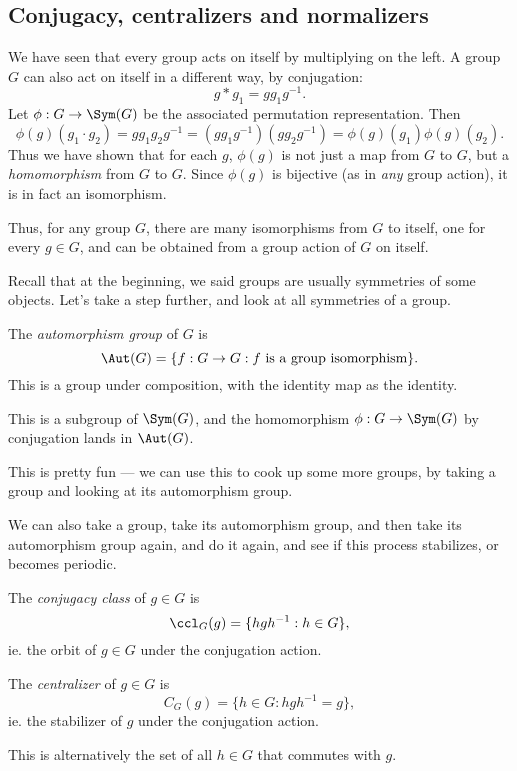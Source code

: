 \documentclass[a4paper]{article}
\begin{document}
\subsection{Conjugacy, centralizers and normalizers}
We have seen that every group acts on itself by multiplying on the left. A group $G$ can also act on itself in a different way, by conjugation:
\[
  g * g_1 = g g_1 g^{-1}.
\]
Let $\phi: G \to \Sym(G)$ be the associated permutation representation. Then
\[
  \phi(g) (g_1 \cdot g_2) = g g_1 g_2 g^{-1} = (g g_1 g^{-1})(g g_2 g^{-1}) = \phi(g)(g_1) \phi(g) (g_2).
\]
Thus we have shown that for each $g$, $\phi(g)$ is not just a map from $G$ to $G$, but a \emph{homomorphism} from $G$ to $G$. Since $\phi(g)$ is bijective (as in \emph{any} group action), it is in fact an isomorphism.

Thus, for any group $G$, there are many isomorphisms from $G$ to itself, one for every $g \in G$, and can be obtained from a group action of $G$ on itself.

Recall that at the beginning, we said groups are usually symmetries of some objects. Let's take a step further, and look at all symmetries of a group.
\begin{defi}
  The \emph{automorphism group} of $G$ is
  \[
    \Aut(G) = \{f: G \to G: f\text{ is a group isomorphism}\}.
  \]
  This is a group under composition, with the identity map as the identity.
\end{defi}
This is a subgroup of $\Sym(G)$, and the homomorphism $\phi: G\to \Sym(G)$ by conjugation lands in $\Aut(G)$.

This is pretty fun --- we can use this to cook up some more groups, by taking a group and looking at its automorphism group.

We can also take a group, take its automorphism group, and then take its automorphism group again, and do it again, and see if this process stabilizes, or becomes periodic.

\begin{defi}
  The \emph{conjugacy class} of $g \in G$ is
  \[
    \ccl_G(g) = \{hgh^{-1}: h \in G\},
  \]
  ie. the orbit of $g \in G$ under the conjugation action.
\end{defi}

\begin{defi}[Centralizer]
  The \emph{centralizer} of $g \in G$ is
  \[
    C_G(g) = \{h \in G: hgh^{-1} = g\},
  \]
  ie. the stabilizer of $g$ under the conjugation action.
\end{defi}
This is alternatively the set of all $h \in G$ that commutes with $g$.
\end{document}
